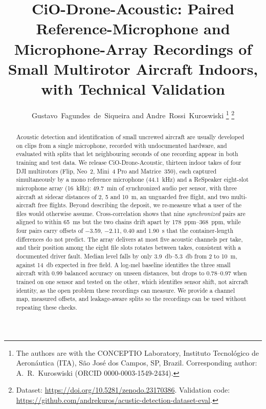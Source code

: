 \documentclass[journal]{IEEEtran}
\begin{document}
\title{CiO-Drone-Acoustic: Paired Reference-Microphone and Microphone-Array Recordings of Small Multirotor Aircraft Indoors, with Technical Validation}

\author{Gustavo~Fagundes~de~Siqueira and Andre~Rossi~Kuroswiski%
\thanks{The authors are with the CONCEPTIO Laboratory, Instituto Tecnol\'ogico de Aeron\'autica (ITA), S\~ao Jos\'e dos Campos, SP, Brazil. Corresponding author: A.~R.~Kuroswiski (ORCID 0000-0003-1549-2434).}%
\thanks{Dataset: \protect\url{https://doi.org/10.5281/zenodo.23170386}. Validation code: \protect\url{https://github.com/andrekuros/acustic-detection-dataset-eval}.}}

\maketitle

\begin{abstract}
Acoustic detection and identification of small uncrewed aircraft are usually developed on clips from a single microphone, recorded with undocumented hardware, and evaluated with splits that let neighbouring seconds of one recording appear in both training and test data.
We release CiO-Drone-Acoustic, thirteen indoor takes of four DJI multirotors (Flip, Neo~2, Mini~4 Pro and Matrice~350), each captured simultaneously by a mono reference microphone (\SI{44.1}{\kilo\hertz}) and a ReSpeaker eight-slot microphone array (\SI{16}{\kilo\hertz}): \SI{49.7}{\minute} of synchronized audio per sensor, with three aircraft at sidecar distances of 2, 5 and \SI{10}{\meter}, an unguarded free flight, and two multi-aircraft free flights.
Beyond describing the deposit, we re-measure what a user of the files would otherwise assume.
Cross-correlation shows that nine \emph{synchronized} pairs are aligned to within \SI{65}{\milli\second} but the two chains drift apart by \SIrange{178}{368}{ppm}, while four pairs carry offsets of \SI{-3.59}{}, \SI{-2.11}{}, \SI{+0.40}{} and \SI{+1.90}{\second} that the container-length differences do not predict.
The array delivers at most five acoustic channels per take, and their position among the eight file slots rotates between takes, consistent with a documented driver fault.
Median level falls by only \SIrange{3.9}{5.3}{\decibel} from 2 to \SI{10}{\meter}, against \SI{14}{\decibel} expected in free field.
A log-mel baseline identifies the three small aircraft with 0.99 balanced accuracy on unseen distances, but drops to 0.78--0.97 when trained on one sensor and tested on the other, which identifies sensor shift, not aircraft identity, as the open problem these recordings can measure.
We provide a channel map, measured offsets, and leakage-aware splits so the recordings can be used without repeating these checks.
\end{abstract}
\end{document}
